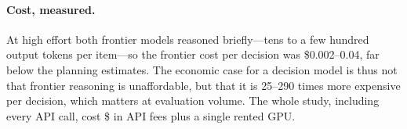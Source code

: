\paragraph{Cost, measured.}
At high effort both frontier models reasoned briefly---tens to a few hundred output tokens per item---so the frontier cost per decision was \$0.002--0.04, far below the planning estimates.
The economic case for a decision model is thus not that frontier reasoning is unaffordable, but that it is 25--290 times more expensive per decision, which matters at evaluation volume.
The whole study, including every API call, cost \$\ApiTotal{} in API fees plus a single rented GPU.
